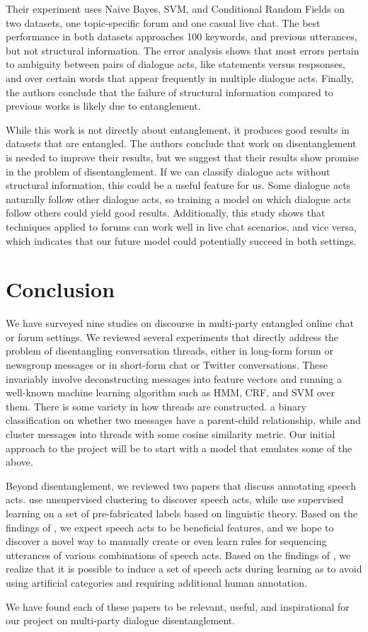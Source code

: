 \documentclass[11pt]{article}
\begin{document}
Their experiment uses Naive Bayes, SVM, and Conditional Random Fields on two
datasets, one topic-specific forum and one casual live chat. The best
performance in both datasets approaches 100%
keywords, and previous utterances, but not structural information. The error
analysis shows that most errors pertain to ambiguity between pairs of dialogue
acts, like statements versus respsonses, and over certain words that appear
frequently in multiple dialogue acts. Finally, the authors conclude that the
failure of structural information compared to previous works is likely due to
entanglement.

While this work is not directly about entanglement, it produces good results in
datasets that are entangled. The authors conclude that work on
disentanglement is needed to improve their results, but we suggest that their
results show promise in the problem of disentanglement. If we can classify
dialogue acts without structural information, this could be a useful feature
for us. Some dialogue acts naturally follow other dialogue acts, so training a
model on which dialogue acts follow others could yield good results.
Additionally, this study shows that techniques applied to forums can work well
in live chat scenarios, and vice versa, which indicates that our future model
could potentially succeed in both settings.

\section{Conclusion}

We have surveyed nine studies on discourse in multi-party entangled online 
chat or forum settings. We reviewed several experiments that directly address
the problem of disentangling conversation threads, either in long-form forum
or newsgroup messages or in short-form chat or Twitter conversations. These
invariably involve deconstructing messages into feature vectors and running a 
well-known machine learning algorithm such as HMM, CRF, and SVM over them.
There is some variety in how threads are constructed. \cite{Aumayr2011a}
a binary classification on whether two messages have a parent-child
relationship, while \cite{Mayfield2012a} and \cite{Wang2008a} cluster messages
into threads with some cosine similarity metric. Our initial approach to the project will be to start with a model that emulates some of the above.

Beyond disentanglement, we reviewed two papers that discuss annotating speech 
acts. \cite{Ritter2010a} use unsupervised clustering to discover speech acts,
while \cite{Kim2012} use supervised learning on a set of pre-fabricated labels 
based on linguistic theory. Based on the findings of \cite{Kim2012}, we expect
speech acts to be beneficial features, and we hope to discover a novel way
to manually create or even learn rules for sequencing utterances of various
combinations of speech acts. Based on the findings of \cite{Ritter2010a}, we
realize that it is possible to induce a set of speech acts during learning
as to avoid using artificial categories and requiring additional human 
annotation.

We have found each of these papers to be relevant, useful, and inspirational
for our project on multi-party dialogue disentanglement.

{} 
\end{document}
